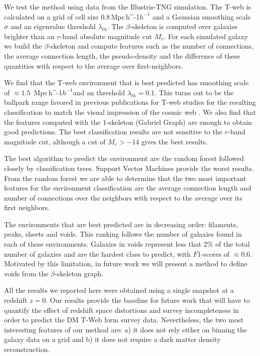 \documentclass[usenatbib]{mnras}
\newcommand{\Mpch}{\,{\rm Mpc}\,\ifmmode h^{-1}\else $h^{-1}$\fi}
\begin{document}
We test the method using data from the Illustris-TNG simulation.
The T-web is calculated on a grid of cell size $0.8$\Mpch 
and a Gaussian smoothing scale $\sigma$ and an eigenvalue threshold $\lambda_{th}$.
The $\beta$-skeleton is computed over galaxies brighter than 
an $r$-band absolute magnitude cut $M_{r}$.
For each simulated galaxy we build the $\beta$-skeleton and
compute features such as the number of connections, the average connection
length, the pseudo-density and the difference of these quantities with
respect to the average over first-neighbors.

We find that the T-web environment that is best predicted has smoothing
scale of $\approx1.5$ \Mpch and an threshold $\lambda_{th}=0.1$. 
This turns out to be the ballpark range favored in previous publications
for T-web  studies for the resulting classification to match the visual impression of the cosmic web \citep{Forero-Romero2009}.
We also find that the features computed with the $1$-skeleton 
(Gabriel Graph) are enough to obtain good predictions. 
The best classification results are not sensitive to the $r$-band
magnitude cut, although a cut of $M_r>-14$ gives the best results.

The best algorithm to predict the environment are the random forest followed closely by classification trees. 
Support Vector Machines provide the worst results.
From the random forest we are able to determine that the two most
important features for the environment classification are the average connection length and number of connections over the neighbors with respect to the average over its first neighbors.

The environments that are best predicted are in decreasing order: 
filaments, peaks, sheets and voids. 
This ranking follows the number of galaxies found in each of these environments.
Galaxies in voids represent less that $2\%$ of the total number of galaxies and 
are the hardest class to predict, with $F1$-scores of $\approx0.6$.
Motivated by this limitation, in future work we will present a method to define
voids from the $\beta$-skeleton graph.

All the results we reported here were obtained using a single snapshot at a 
redshift $z=0$.
Our results provide the baseline for future work that will have to quantify 
the effect of redshift space distortions and survey incompleteness in order to
predict  the DM T-Web form survey data.
Nevertheless, the two most interesting features of our method are: a) it does not
rely either on binning the galaxy data on a grid and b) it does not require a dark matter density reconstruction.
\end{document}
